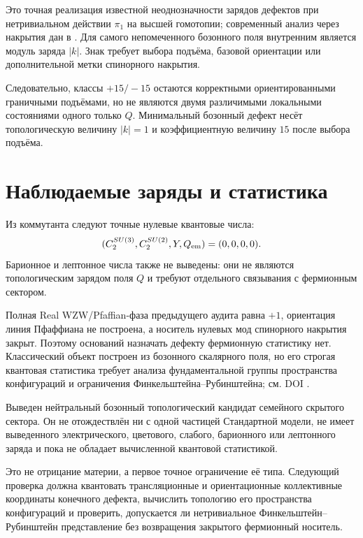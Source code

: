 Это точная реализация известной неоднозначности зарядов дефектов при
нетривиальном действии $\pi_1$ на высшей гомотопии; современный анализ
через накрытия дан в . Для самого непомеченного
бозонного поля внутренним является модуль заряда $|k|$. Знак требует
выбора подъёма, базовой ориентации или дополнительной метки спинорного накрытия.

Следовательно, классы $+15/-15$ остаются корректными ориентированными
граничными подъёмами, но не являются двумя различимыми локальными
состояниями одного только $Q$. Минимальный бозонный дефект несёт
топологическую величину $|k|=1$ и коэффициентную величину $15$ после
выбора подъёма.

\section{Наблюдаемые заряды и статистика}

Из коммутанта следуют точные нулевые квантовые числа:
\begin{equation}
 (C_2^{SU(3)},C_2^{SU(2)},Y,Q_{\rm em})=(0,0,0,0).
\end{equation}
Барионное и лептонное числа также не выведены: они не являются
топологическим зарядом поля $Q$ и требуют отдельного связывания с
фермионным сектором.

Полная Real WZW/Pfaffian-фаза предыдущего аудита равна $+1$, ориентация
линия Пфаффиана не построена, а носитель нулевых мод спинорного накрытия закрыт.
Поэтому оснований назначать дефекту фермионную статистику нет.
Классический объект построен из бозонного скалярного поля, но его строгая
квантовая статистика требует анализа фундаментальной группы пространства
конфигураций и ограничения Финкельштейна--Рубинштейна; см. DOI
.

\begin{proposition}
Выведен нейтральный бозонный топологический кандидат семейного скрытого
сектора. Он не отождествлён ни с одной частицей Стандартной модели, не
имеет выведенного электрического, цветового, слабого, барионного или
лептонного заряда и пока не обладает вычисленной квантовой статистикой.
\end{proposition}

Это не отрицание материи, а первое точное ограничение её типа. Следующий
проверка должна квантовать трансляционные и ориентационные коллективные
координаты конечного дефекта, вычислить топологию его пространства
конфигураций и проверить, допускается ли нетривиальное
Финкельштейн--Рубинштейн представление без возвращения закрытого
фермионный носитель.

